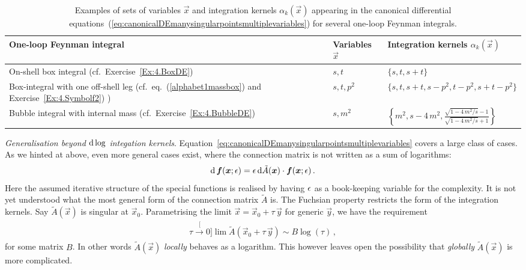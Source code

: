 \begin{table}[t]
\centering
\renewcommand{\arraystretch}{2.0}
\begin{tabular}{|>{\centering\arraybackslash}p{4.8 cm}|>{\centering\arraybackslash}p{1.6 cm}|>{\centering\arraybackslash}p{5.0 cm}|}
\hline
\textbf{One-loop Feynman integral}  & \textbf{Variables} $\vec{x}$ & \textbf{Integration kernels} $\alpha_{k}(\vec{x})$ \\
\hline
On-shell box integral \hspace{2cm}(cf.\ Exercise~\ref{Ex:4.BoxDE})& $s, t$ & $\{ s, t, s+t \}$ \\
\hline
Box-integral with one off-shell leg \hspace{1cm} (cf.\ eq.~(\ref{alphabet1massbox}) and Exercise~\ref{Ex:4.Symbolf2}) )& $s, t, p^2$ & $ \{ s, t, s+t, s-p^2, t-p^2, s+t-p^2 \}$ \\
\hline
Bubble integral with internal mass \hspace{1cm} (cf.\ Exercise~\ref{Ex:4.BubbleDE}) & $s, m^2$ & $\left\{ m^2, s-4 \, m^2 ,  \frac{ \sqrt{1-4 \, m^2/s } -1 }{ \sqrt{1-4 \, m^2/s } +1} \right\}$ \\
\hline
\end{tabular}
\caption{Examples of sets of variables $\vec{x}$ and integration kernels $\alpha_{k}(\vec{x})$ appearing in the canonical differential equations~(\ref{eq:canonicalDEmanysingularpointsmultiplevariables}) for several one-loop Feynman integrals.}
\label{tab:examples:alphabets}
\end{table}


\smallskip

{\it Generalisation beyond $\mathrm{d}\log$ integation kernels}.
Equation~\eqref{eq:canonicalDEmanysingularpointsmultiplevariables} covers a large class of cases.
As we hinted at above, even more general cases exist, where the connection matrix is not written as a sum of logarithms:
\begin{align}
\label{eq:canonicalDEmanysingularpointsmultiplevariables3}
\d \, \vec{f}(\vec{x};\eps) = \eps \, \d \tilde{A}(\vec{x}) \cdot \vec{f}(\vec{x};\eps) \,.
\end{align}
Here the assumed iterative structure of the special functions is realised by having $\epsilon$ as a book-keeping variable for the complexity. 
It is not yet understood what the most general form of the connection matrix $\tilde{A}$ is.
The Fuchsian property restricts the form of the integration kernels. 
Say $\tilde{A}(\vec{x})$ is singular at $\vec{x}_{0}$. Parametrising the limit $\vec{x} = \vec{x}_{0} + \tau \, \vec{y}$ for generic $\vec{y}$,
we have the requirement
\begin{align}
 \stackrel[{\tau \to 0}]{}{\lim}  \tilde{A}(\vec{x}_{0} + \tau \, \vec{y} ) \sim B \log(\tau) \,,
\end{align}
for some matrix $B$. In other words $\tilde{A}(\vec{x})$ {\it locally} behaves as a logarithm.
This however leaves open the possibility that {\it globally} $\tilde{A}(\vec{x})$ is more complicated.



